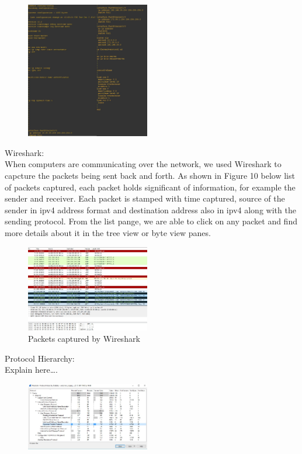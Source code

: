 \documentclass{article}
\begin{document}
\begin{figure}[H]
	\begin{center}
		\includegraphics[width=0.48\textwidth]{Routerconfig.jpg}
	\end{center}
	\caption{\small  \newline}
	\label{fig:Prd}
\end{figure}


Wireshark:\\
When computers are communicating over the network, we used Wireshark to capcture the packets being sent back and forth. As shown in Figure 10 below list of packets captured, each packet holds significant of information, for example the sender and receiver. Each packet is stamped with time captured, source of the sender in ipv4 address format and destination address also in ipv4 along with the sending protocol. From the list pange, we are able to click on any packet and find more details about it in the tree view or byte view panes. 

\begin{figure}[H]
	\begin{center}
		\includegraphics[width=0.48\textwidth]{wireshark.jpg}
	\end{center}
	\caption{Packets captured by Wireshark}
	\label{fig:Prd}
\end{figure}

Protocol Hierarchy:\\
Explain here….


\begin{figure}[H]
	\begin{center}
		\includegraphics[width=0.48\textwidth]{Hierarchyst.jpg}
	\end{center}
	\caption{\small  \newline}
	\label{fig:Prd}
\end{figure}



\end{document}
